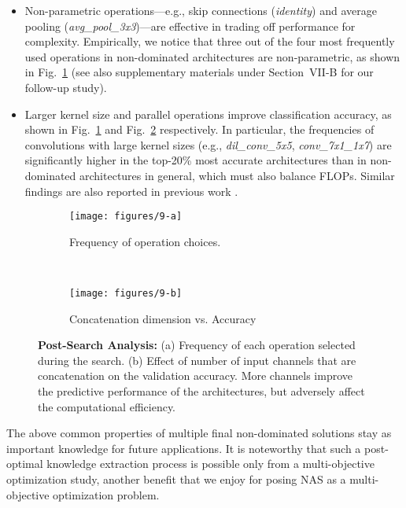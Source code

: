 \documentclass[journal]{IEEEtran}
\theoremstyle{definition}
\theoremstyle{remark}
\begin{document}
\begin{itemize}
    \item Non-parametric operations---e.g., skip connections (\emph{identity}) and average pooling (\emph{avg_pool_3x3})---are effective in trading off performance for complexity. Empirically, we notice that three out of the four most frequently used operations in non-dominated architectures are non-parametric, as shown in Fig.~\ref{fig:ops_frequency} ({see also supplementary materials under Section~VII-B for our follow-up study}).

    \item Larger kernel size and parallel operations improve classification accuracy, as shown in Fig.~\ref{fig:ops_frequency} and Fig.~\ref{fig:concat_inputs} respectively. In particular, the frequencies of convolutions with large kernel sizes (e.g., \emph{dil_conv_5x5}, \emph{conv_7x1_1x7}) are significantly higher in the top-20\% most accurate architectures than in non-dominated architectures in general, which must also balance FLOPs. Similar findings are also reported in previous work \cite{xie2017aggregated,real2019regularized}.
    \begin{comment}
    \item Parallel operations are more beneficial to classification performance than sequential operations. The concatenation dimensions shown in Fig.~\ref{fig:concat_inputs} indicate the number of parallel paths in a block structure. Clearly, the higher the number of inputs concatenated, the higher the validation accuracy, on average. Similar findings are also reported in previous works \cite{xie2017aggregated,real2019regularized}.
    \end{comment}
\end{itemize}

\begin{figure}[!htbp]
	\centering
	\begin{subfigure}[t]{.35\textwidth}
		\centering
		\texttt{[image: figures/9-a]}
		\caption{Frequency of operation choices.\label{fig:ops_frequency}}
	\end{subfigure}\\
	\begin{subfigure}[t]{.35\textwidth}
		\centering
		\texttt{[image: figures/9-b]}
		\caption{Concatenation dimension vs. Accuracy\label{fig:concat_inputs}}
	\end{subfigure}
	\caption{\textbf{Post-Search Analysis:} (a) Frequency of each operation selected during the search. (b) Effect of number of input channels that are concatenation on the validation accuracy. More channels improve the predictive performance of the architectures, but adversely affect the computational efficiency.
	\label{fig:intepretation}}
	\vspace{-1em}
\end{figure}
The above common properties of multiple final non-dominated solutions stay as important knowledge for future applications. It is noteworthy that such a post-optimal knowledge extraction process is possible only from a multi-objective optimization study, another benefit that we enjoy for posing NAS as a multi-objective optimization problem.
\end{document}
